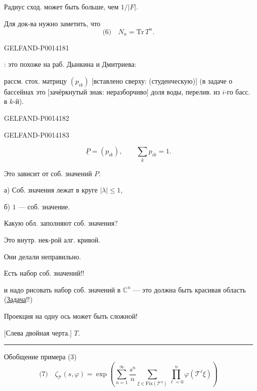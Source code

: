 Радиус сход. может быть больше, чем \(1/|F|\).

Для док-ва нужно заметить, что
\[
\text{(6)}\quad N_n=\mathrm{Tr}\,T^n.
\]


\begin{GelfandAdjacentEvidence}{GELFAND-P001418}{1}

: это похоже на раб. Дынкина и Дмитриева:

рассм. стох. матрицу \((p_{ik})\)
[вставлено сверху: (студенческую)] (в задаче о бассейнах это
[зачёркнутый знак: неразборчиво] доля воды, перелив. из \(i\)-го басс. в \(k\)-й).
\end{GelfandAdjacentEvidence}
\begin{GelfandAdjacentEvidence}{GELFAND-P001418}{2}

\end{GelfandAdjacentEvidence}
\begin{GelfandAdjacentEvidence}{GELFAND-P001418}{3}


\[
\underline{P}=(p_{ik}),\qquad \sum_k p_{ik}=1.
\]

Это зависит от соб. значений \(P\).

а) Соб. значения лежат в круге \(|\lambda|\leq1\),

б) \(1\) — соб. значение.

Какую обл. заполняют соб. значения?

Это внутр. нек-рой алг. кривой.

Они делали неправильно.

Есть набор соб. значений!!

и надо рисовать набор соб. значений в \(\mathbb C^n\) — это должна быть красивая область (\uline{Задача}!!)

Проекция на одну ось может быть сложной!

[Слева двойная черта.]
\quad \(T\).

\smallskip\hrule\smallskip

 Обобщение примера (3)
\[
\text{(7)}\quad \zeta_{\mathcal T}(s,\varphi)=
 \exp\left(
 \sum_{n=1}^{\infty}\frac{s^n}{n}
 \sum_{\xi\in\mathrm{Fix}(\mathcal T^n)}
 \prod_{\ell=0}^{n}\varphi(\mathcal T^\ell\xi)
 \right)
\]
\end{GelfandAdjacentEvidence}
